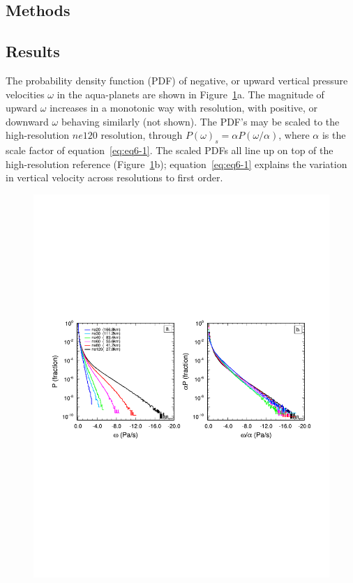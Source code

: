 \subsection{Methods}

\subsection{Results}

The probability density function (PDF) of negative, or upward vertical pressure velocities $\omega$ in the aqua-planets are shown in Figure~\ref{fig:2pdf}a. The magnitude of upward $\omega$ increases in a monotonic way with resolution, with positive, or downward $\omega$ behaving similarly (not shown). The PDF's may be scaled to the high-resolution $ne120$ resolution, through $P(\omega)_s = \alpha P (\omega / \alpha)$, where $\alpha$ is the scale factor of equation~\ref{eq:eq6-1}. The scaled PDFs all line up on top of the high-resolution reference (Figure~\ref{fig:2pdf}b); equation~\ref{eq:eq6-1} explains the variation in vertical velocity across resolutions to first order. 

\begin{figure}[t]
\begin{center}
\noindent\includegraphics[width=30pc,angle=0]{chapter6/temp_2pdf.pdf}\\
\end{center}
\caption{}
\label{fig:2pdf}
\end{figure}

